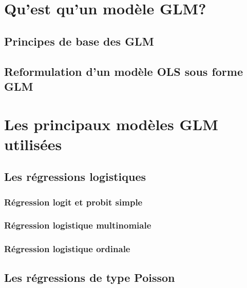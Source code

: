 \documentclass[
  11pt,
  french,
]{book}
\begin{document}
\hypertarget{sect061}{%
\section{Qu'est qu'un modèle GLM?}\label{sect061}}

\hypertarget{sect0611}{%
\subsection{Principes de base des GLM}\label{sect0611}}

\hypertarget{sect0612}{%
\subsection{Reformulation d'un modèle OLS sous forme GLM}\label{sect0612}}

\hypertarget{sect062}{%
\section{Les principaux modèles GLM utilisées}\label{sect062}}

\hypertarget{sect0621}{%
\subsection{Les régressions logistiques}\label{sect0621}}

\hypertarget{sect06211}{%
\subsubsection{Régression logit et probit simple}\label{sect06211}}

\hypertarget{sect06212}{%
\subsubsection{Régression logistique multinomiale}\label{sect06212}}

\hypertarget{sect06213}{%
\subsubsection{Régression logistique ordinale}\label{sect06213}}

\hypertarget{sect0623}{%
\subsection{Les régressions de type Poisson}\label{sect0623}}
\end{document}

